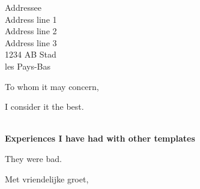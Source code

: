 \documentclass[
  fontsize=11pt,
  paper=a4,
  foldmarks=off,           %
  enlargefirstpage=on,    %
  fromalign=right,        %
  fromphone=off,           %
  fromemail=off,
  fromlogo=off,
  fromrule=on,            %
  fromrule=aftername,     %
  location=on,
  addrfield=on,           %
  backaddress=on,         %
  subject=afteropening,   %
  pagenumber=foot,
]{scrlttr2}
\begin{document}
  \begin{letter}{%
    Addressee \\
    Address line 1 \\
    Address line 2 \\
    Address line 3 \\
    1234 AB Stad \\
    les Pays-Bas
    }
    
    
  
    \opening{To whom it may concern,} %
    
    I consider it the best.
    
    \lipsum[1-4]  \\
    
    
    \textbf{Experiences I have had with other templates}
    
    They were bad. 
    
    \lipsum[5]
    
	
    \closing{Met vriendelijke groet,}
    
    
    
    
    
    
    \end{letter}
\end{document}
